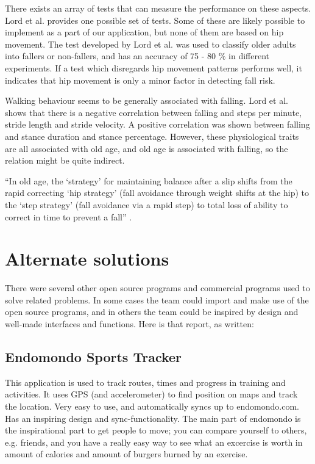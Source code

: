 There exists an array of tests that can measure the performance on these aspects. Lord et al. \cite{LMTassessPrev} provides one possible set of tests. Some of these are likely possible to implement as a part of our application, but none of them are based on hip movement.
	The test developed by Lord et al. \cite{LMTassessPrev} was used to classify older adults into fallers or non-fallers, and has an accuracy of 75 - 80 \% in different experiments. If a test which disregards hip movement patterns performs well, it indicates that hip movement is only a minor factor in detecting fall risk.

Walking behaviour seems to be generally associated with falling. Lord et al. \cite{LLKgaitPatterns} shows that there is a negative correlation between falling and steps per minute, stride length and stride velocity. A positive correlation was shown between falling and stance duration and stance percentage. However, these physiological traits are all associated with old age, and old age is associated with falling, so the relation might be quite indirect.

“In old age, the ‘strategy’ for maintaining balance after a slip shifts from the rapid correcting ‘hip strategy’ (fall avoidance through weight shifts at the hip) to the ‘step strategy’ (fall avoidance via a rapid step) to total loss of ability to correct in time to prevent a fall” \cite{fallsRubenstein}.
\section{Alternate solutions}
There were several other open source programs and commercial programs used to solve related problems. In some cases the team could import and make use of the open source programs, and in others the team could be inspired by design and well-made interfaces and functions. Here is that report, as written:

\subsection{Endomondo Sports Tracker}
This application is used to track routes, times and progress in training and activities. It uses GPS (and accelerometer) to find position on maps and track the location. Very easy to use, and automatically syncs up to endomondo.com. Has an inspiring design and sync-functionality.
The main part of endomondo is the inspirational part to get people to move; you can compare yourself to others, e.g. friends, and you have a really easy way to see what an excercise is worth in amount of calories and amount of burgers burned by an exercise.

